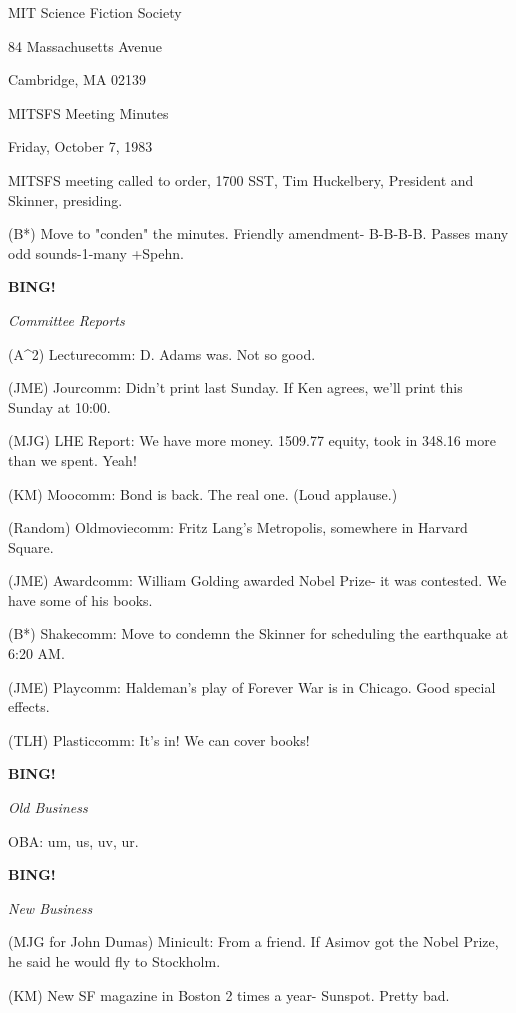 \documentclass[12pt]{article}
\newcommand{\bing}{{\bf BING!} }
\newcommand{\goto}[1]{\bing \vskip 12pt \centerline{{\em{#1}}}}
\begin{document}
\begin{center}

MIT Science Fiction Society 

84 Massachusetts Avenue

Cambridge, MA 02139

\vspace{12pt}

MITSFS Meeting Minutes 

Friday, October 7, 1983

\end{center}
 
\vspace{18pt}

\setlength{\parskip}{6pt}

\noindent
MITSFS meeting called to order, 1700 SST,
Tim Huckelbery, President and Skinner, presiding.

(B*) Move to "conden" the minutes. Friendly amendment- B-B-B-B. Passes many odd sounds-1-many +Spehn.

\goto{Committee Reports}

(A^2) Lecturecomm: D. Adams was. Not so good.

(JME) Jourcomm: Didn't print last Sunday. If Ken agrees, we'll print this Sunday at 10:00.

(MJG) LHE Report: We have more money. 1509.77 equity, took in 348.16 more than we spent. Yeah!

(KM) Moocomm: Bond is back. The real one. (Loud applause.)

(Random) Oldmoviecomm: Fritz Lang's Metropolis, somewhere in Harvard Square.

(JME) Awardcomm: William Golding awarded Nobel Prize- it was contested. We have some of his books.

(B*) Shakecomm: Move to condemn the Skinner for scheduling the earthquake at 6:20 AM.

(JME) Playcomm: Haldeman's play of Forever War is in Chicago. Good special effects.

(TLH) Plasticcomm: It's in! We can cover books!

\goto{Old Business}

OBA: um, us, uv, ur.

\goto{New Business}

(MJG for John Dumas) Minicult: From a friend. If Asimov got the Nobel Prize, he said he would fly to Stockholm.

(KM) New SF magazine in Boston 2 times a year- Sunspot. Pretty bad.
\end{document}
